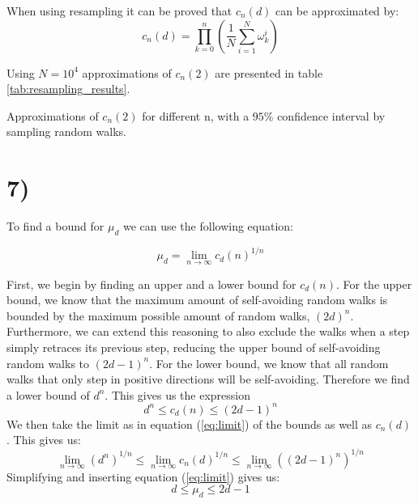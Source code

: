 \documentclass[a4paper]{article}
\begin{document}
When using resampling it can be proved that $c_n(d)$ can be approximated by:
\begin{equation}
    c_n(d) = \prod_{k = 0}^n(\frac{1}{N}\sum_{i=1}^N\omega_k^i)
\end{equation}

Using $N = 10^4$ approximations of $c_n(2)$ are presented in table \ref{tab:resampling_results}.

\begin{table}[H]
    \centering
    \caption{Approximations of $c_n(2)$ for different n, with a $95\%$ confidence interval by sampling random walks.}
    \label{tab:resampling_results}
    
\end{table}

\section*{7)}

To find a bound for $\mu_d$ we can use the following equation:

\begin{equation}
    \label{eq:limit}
     \mu_d = \lim_{n \to \infty} c_d(n)^{1/n}
\end{equation}


First, we begin by finding an upper and a lower bound for $c_d(n)$. For the upper bound, we know that the maximum amount of self-avoiding random walks is bounded by the maximum possible amount of random walks, $(2d)^n$. Furthermore, we can extend this reasoning to also exclude the walks when a step simply retraces its previous step, reducing the upper bound of self-avoiding random walks to $(2d-1)^n$. For the lower bound, we know that all random walks that only step in positive directions will be self-avoiding. Therefore we find a lower bound of $d^n$. This gives us the expression \begin{equation}
    d^n \leq c_d(n) \leq (2d-1)^n
\end{equation}
We then take the limit as in equation (\ref{eq:limit}) of the bounds as well as $c_n(d)$. This gives us:
\begin{equation}
    \lim_{n \to \infty} (d^n)^{1/n} \leq \lim_{n \to \infty} c_n(d)^{1/n} \leq \lim_{n \to \infty} ((2d-1)^n)^{1/n}
\end{equation}
Simplifying and inserting equation (\ref{eq:limit}) gives us:
\begin{equation}
    d \leq \mu_d \leq 2d-1
\end{equation}
\end{document}
